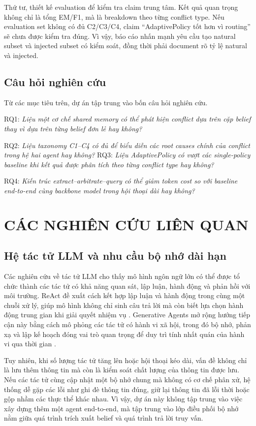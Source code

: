 \documentclass[12pt,a4paper]{article}
\begin{document}
Thứ tư, thiết kế evaluation để kiểm tra claim trung tâm. Kết quả quan trọng không chỉ là tổng EM/F1, mà là breakdown theo từng conflict type. Nếu evaluation set không có đủ C2/C3/C4, claim ``AdaptivePolicy tốt hơn vì routing'' sẽ chưa được kiểm tra đúng. Vì vậy, báo cáo nhấn mạnh yêu cầu tạo natural subset và injected subset có kiểm soát, đồng thời phải document rõ tỷ lệ natural và injected.

\subsection{Câu hỏi nghiên cứu}

Từ các mục tiêu trên, dự án tập trung vào bốn câu hỏi nghiên cứu.

RQ1: \textit{Liệu một cơ chế shared memory có thể phát hiện conflict dựa trên cặp belief thay vì dựa trên từng belief đơn lẻ hay không?}

RQ2: \textit{Liệu taxonomy C1--C4 có đủ để biểu diễn các root causes chính của conflict trong hệ hai agent hay không?} 
RQ3: \textit{Liệu AdaptivePolicy có vượt các single-policy baseline khi kết quả được phân tích theo từng conflict type hay không?}

RQ4: \textit{Kiến trúc extract--arbitrate--query có thể giảm token cost so với baseline end-to-end cùng backbone model trong hội thoại dài hay không?}


\section{CÁC NGHIÊN CỨU LIÊN QUAN}

\subsection{Hệ tác tử LLM và nhu cầu bộ nhớ dài hạn}

Các nghiên cứu về tác tử LLM cho thấy mô hình ngôn ngữ lớn có thể được tổ chức thành các tác tử có khả năng quan sát, lập luận, hành động và phản hồi với môi trường. ReAct đề xuất cách kết hợp lập luận và hành động trong cùng một chuỗi xử lý, giúp mô hình không chỉ sinh câu trả lời mà còn biết lựa chọn hành động trung gian khi giải quyết nhiệm vụ \cite{yao2023react}. Generative Agents mở rộng hướng tiếp cận này bằng cách mô phỏng các tác tử có hành vi xã hội, trong đó bộ nhớ, phản xạ và lập kế hoạch đóng vai trò quan trọng để duy trì tính nhất quán của hành vi qua thời gian \cite{park2023generative}.

Tuy nhiên, khi số lượng tác tử tăng lên hoặc hội thoại kéo dài, vấn đề không chỉ là lưu thêm thông tin mà còn là kiểm soát chất lượng của thông tin được lưu. Nếu các tác tử cùng cập nhật một bộ nhớ chung mà không có cơ chế phân xử, hệ thống dễ gặp các lỗi như ghi đè thông tin đúng, giữ lại thông tin đã lỗi thời hoặc gộp nhầm các thực thể khác nhau. Vì vậy, dự án này không tập trung vào việc xây dựng thêm một agent end-to-end, mà tập trung vào lớp điều phối bộ nhớ nằm giữa quá trình trích xuất belief và quá trình trả lời truy vấn.
\end{document}
